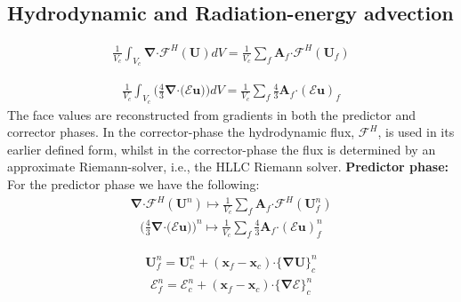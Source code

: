 \documentclass[10pt,letterpaper,notitlepage]{article}
\numberwithin{equation}{section}
\newcommand{\bnabla}{\boldsymbol{\nabla}}
\newcommand{\position}{\mathbf{x}}
\newcommand{\velocity}{\mathbf{u}}
\newcommand{\dotp}{\boldsymbol{\cdot}}
\newcommand{\RadE}{\mathcal{E}}
\newcommand{\HydroF}{\mathcal{F}^H}
\newcommand{\HydroU}{\mathbf{U}}
\newcommand{\AreaVec}{\mathbf{A}}
\newcommand{\beqn}{\begin{equation}\begin{aligned}}
\newcommand{\eeqn}{\end{aligned}\end{equation}}
\begin{document}
\subsection{Hydrodynamic and Radiation-energy advection}
\beqn 
\frac{1}{V_c} \int_{V_c} 
\bnabla \dotp \HydroF (\HydroU) 
dV = \frac{1}{V_c}
\sum_f \AreaVec_f \dotp  \HydroF(\HydroU_f)
\eeqn 

\beqn 
\frac{1}{V_c} \int_{V_c} 
\biggr(\frac{4}{3} \bnabla \dotp \bigr(\RadE \velocity)\biggr)
dV = \frac{1}{V_c}
\sum_f \frac{4}{3}  \AreaVec_f \dotp (\RadE \velocity)_f
\eeqn 
The face values are reconstructed from gradients in both the predictor and corrector phases. In the corrector-phase the hydrodynamic flux, $\HydroF$, is used in its earlier defined form, whilst in the corrector-phase the flux is determined by an approximate Riemann-solver, i.e., the HLLC Riemann solver.
\newline
\newline 
\textbf{Predictor phase:}\newline 
For the predictor phase we have the following:
\beqn 
\bnabla \dotp \HydroF (\HydroU^n)
\mapsto 
\frac{1}{V_c}
\sum_f \AreaVec_f \dotp  \HydroF(\HydroU_f^n)
\eeqn 
\beqn 
\biggr(\frac{4}{3} \bnabla \dotp \bigr(\RadE \velocity)\biggr)^n 
\mapsto 
\frac{1}{V_c}
\sum_f \frac{4}{3}  \AreaVec_f \dotp (\RadE \velocity)_f^n
\eeqn 

\beqn 
\HydroU_f^n = \HydroU_c^n + (\position_f - \position_c) \dotp \{ \bnabla\HydroU \}_c^n
\eeqn 
\beqn 
\RadE_f^n = \RadE_c^n + (\position_f - \position_c) \dotp \{ \bnabla\RadE \}_c^n
\eeqn 
\end{document}
